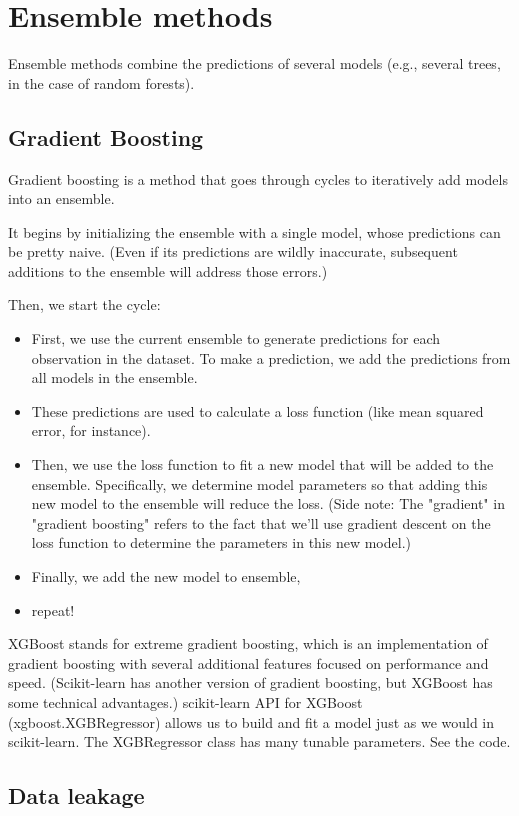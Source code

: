 \documentclass[12pt]{report}
\begin{document}
\section{Ensemble methods}
Ensemble methods combine the predictions of several models (e.g., several trees, in the case of random forests).

\subsection{Gradient Boosting}
Gradient boosting is a method that goes through cycles to iteratively add models into an ensemble.

It begins by initializing the ensemble with a single model, whose predictions can be pretty naive. (Even if its predictions are wildly inaccurate, subsequent additions to the ensemble will address those errors.)

Then, we start the cycle:
\begin{itemize}
  \item First, we use the current ensemble to generate predictions for each observation in the dataset. To make a prediction, we add the predictions from all models in the ensemble.
  \item These predictions are used to calculate a loss function (like mean squared error, for instance).
  \item Then, we use the loss function to fit a new model that will be added to the ensemble. Specifically, we determine model parameters so that adding this new model to the ensemble will reduce the loss. (Side note: The "gradient" in "gradient boosting" refers to the fact that we'll use gradient descent on the loss function to determine the parameters in this new model.)
  \item Finally, we add the new model to ensemble,
  \item repeat!
\end{itemize}

XGBoost stands for extreme gradient boosting, which is an implementation of gradient boosting with several additional features focused on performance and speed. (Scikit-learn has another version of gradient boosting, but XGBoost has some technical advantages.) scikit-learn API for XGBoost (xgboost.XGBRegressor) allows us to build and fit a model just as we would in scikit-learn. The XGBRegressor class has many tunable parameters. See the code.


\subsection{Data leakage}
\end{document}
